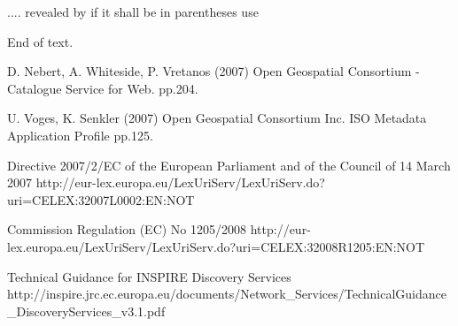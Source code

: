 
.... revealed by \cite{herborg:2003}
if it shall be in parentheses use \citep{herborg:2003}


End of text.

\begin{footnotesize}
\begin{thebibliography}{99}

D. Nebert, A. Whiteside, P. Vretanos (2007)
\newblock Open Geospatial Consortium - Catalogue Service for Web.
 pp.204.

U. Voges, K. Senkler (2007)
\newblock Open Geospatial Consortium Inc. ISO Metadata Application Profile
 pp.125.

Directive 2007/2/EC of the European Parliament and of the Council of 14 March 2007
\newblock http://eur-lex.europa.eu/LexUriServ/LexUriServ.do?uri=CELEX:32007L0002:EN:NOT

Commission Regulation (EC) No 1205/2008
\newblock http://eur-lex.europa.eu/LexUriServ/LexUriServ.do?uri=CELEX:32008R1205:EN:NOT

Technical Guidance for INSPIRE Discovery Services
\newblock http://inspire.jrc.ec.europa.eu/documents/Network_Services/TechnicalGuidance_DiscoveryServices_v3.1.pdf


\end{thebibliography}
\end{footnotesize}

\address{Tom Kralidis\\
\url{http://kralidis.ca/}\\
}

\address{Angelos Tzotsos\\
National Technical University of Athens\\
\url{http://users.ntua.gr/tzotsos/}\\
}

\address{Adam Hinz\\
Azavea\\
\url{https://github.com/ahinz}\\
}

